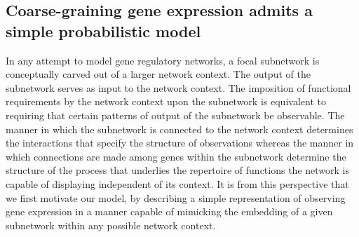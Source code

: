 \subsection{Coarse-graining gene expression admits a simple probabilistic model}
In any attempt to model gene regulatory networks, a focal subnetwork is conceptually carved out of a larger network context. The output of the subnetwork serves as input to the network context. The imposition of functional requirements by the network context upon the subnetwork is equivalent to requiring that certain patterns of output of the subnetwork be observable. The manner in which the subnetwork is connected to the network context determines the interactions that specify the structure of observations whereas the manner in which connections are made among genes within the subnetwork determine the structure of the process that underlies the repertoire of functions the network is capable of displaying independent of its context. It is from this perspective that we first motivate our model, by describing a simple representation of observing gene expression in a manner capable of mimicking the embedding of a given subnetwork within any possible network context.

